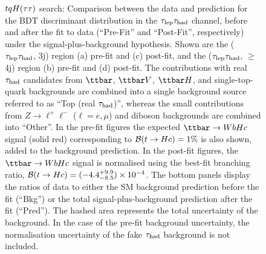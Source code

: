 \begin{figure}[htbp]
\begin{center}
\caption{\small{$tqH(\tau\tau)$ search: Comparison between the data and prediction for the BDT discriminant distribution in the
$\tau_{\mathrm{lep}} \tau_{\mathrm{had}}$ channel, before and after the fit to data  (``Pre-Fit'' and ``Post-Fit'', respectively) under the signal-plus-background hypothesis.
Shown are the ($\tau_{\mathrm{lep}} \tau_{\mathrm{had}}$, 3j) region (a) pre-fit and (c) post-fit, and the ($\tau_{\mathrm{lep}} \tau_{\mathrm{had}}$, $\geq$4j) region (b) pre-fit and (d) post-fit.
The contributions with real $\tau_{\mathrm{had}}$ candidates from $\ttbar$,  $\ttbar V$, $\ttbar H$, and single-top-quark backgrounds are combined into
a single background source referred to as ``Top (real $\tau_{\mathrm{had}}$)'', whereas the small contributions from 
$Z\to \ell^+\ell^-$ ($\ell = e, \mu$) and diboson backgrounds are combined into ``Other''. 
In the pre-fit figures the expected $\Hc$ signal (solid red) corresponding to $\mathcal{B}(t\to Hc)=1\%$ is also shown,
added to the background prediction. In the post-fit figures, the $\Hc$ signal is normalised using the best-fit branching ratio, 
$\mathcal{B}(t\to Hc)=(-4.4^{+9.9}_{-8.5})\times 10^{-4}$.
The bottom panels display the ratios of data to either the SM background prediction before the fit (``Bkg'')  or the total signal-plus-background
prediction after the fit (``Pred''). 
The hashed area represents the total uncertainty of the background. 
In the case of the pre-fit background uncertainty, the normalisation uncertainty of the fake $\tau_{\mathrm{had}}$ background is not included.}}
\label{fig:prepostfit_unblinded_WbHc_lh}
\end{center}
\end{figure}

